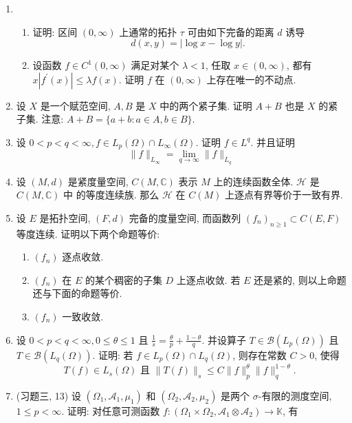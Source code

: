 \begin{enumerate}
        \item \begin{enumerate}
            \item 证明: 区间 $(0, \infty)$ 上通常的拓扑 $\tau$ 可由如下完备的距离 $d$ 诱导
            \[
            d(x, y)=|\log x-\log y| \text {. }
            \]
            \item 设函数 $f \in C^{1}(0, \infty)$ 满足对某个 $\lambda<1$, 任取 $x \in(0, \infty)$, 都有 $x\left|f^{\prime}(x)\right| \leq \lambda f(x)$. 证明 $f$ 在 $(0, \infty)$ 上存在唯一的不动点.
        \end{enumerate}
        \item 设 $X$ 是一个赋范空间, $A,B$ 是 $X$ 中的两个紧子集. 证明 $A+B$ 也是 $X$ 的紧子集. 注意: $A+B=\{a+b: a \in A, b \in B\}$.
        \item 设 $0<p<q<\infty, f \in L_{p}(\Omega) \cap L_{\infty}(\Omega)$. 证明 $f \in L^{q}$. 并且证明
        \[
        \|f\|_{L_{\infty}}=\lim _{q \rightarrow \infty}\|f\|_{L_{q}}
        \]
        \item 设 $(M, d)$ 是紧度量空间, $C(M, \mathbb{C})$ 表示 $M$ 上的连续函数全体. $\mathcal{H}$ 是 $C(M, \mathbb{C})$ 中 的等度连续族. 那么 $\mathcal{H}$ 在 $C(M)$ 上逐点有界等价于一致有界.
        \item 设 $E$ 是拓扑空间, $(F, d)$ 完备的度量空间, 而函数列 $\left(f_{n}\right)_{n \geq 1} \subset C(E, F)$ 等度连续. 证明以下两个命题等价:
            \begin{enumerate}
                \item $\left(f_{n}\right)$ 逐点收敛.
                \item $\left(f_{n}\right)$ 在 $E$ 的某个稠密的子集 $D$ 上逐点收敛. 若 $E$ 还是紧的, 则以上命题还与下面的命题等价.
                \item $\left(f_{n}\right)$ 一致收敛.
            \end{enumerate}
        \item 设 $0<p<q<\infty, 0 \leq \theta \leq 1$ 且 $\frac{1}{s}=\frac{\theta}{p}+\frac{1-\theta}{q}$. 并设算子 $T \in \mathcal{B}\left(L_{p}(\Omega)\right)$ 且 $T \in \mathcal{B}\left(L_{q}(\Omega)\right)$. 证明: 若 $f \in L_{p}(\Omega) \cap L_{q}(\Omega)$, 则存在常数 $C>0$, 使得
        \[
        T(f) \in L_{s}(\Omega) \text { 且 }\|T(f)\|_{s} \leq C\|f\|_{p}^{\theta}\|f\|_{q}^{1-\theta} \text {. }
        \]
        \item (习题三, 13)
        设 $\left(\Omega_{1}, \mathcal{A}_{1}, \mu_{1}\right)$ 和 $\left(\Omega_{2}, \mathcal{A}_{2}, \mu_{2}\right)$ 是两个 $\sigma$-有限的测度空间, $1 \leq p<\infty$. 证明: 对任意可测函数 $f:\left(\Omega_{1} \times \Omega_{2}, \mathcal{A}_{1} \otimes \mathcal{A}_{2}\right) \rightarrow \mathbb{K}$, 有

\end{enumerate}
